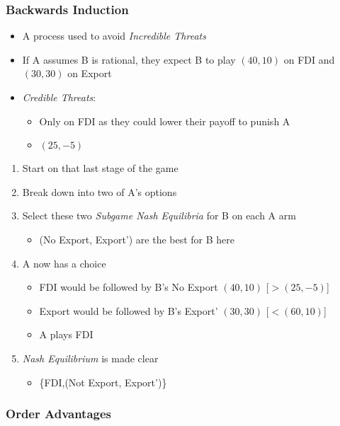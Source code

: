 \documentclass[11pt, english]{article}
\begin{document}
		\subsubsection{Backwards Induction}

	\begin{itemize}
	\setlength\itemsep{0cm}
		\item A process used to avoid \textit{Incredible Threats}
		\item If A assumes B is rational, they expect B to play $(40,10)$ on FDI and $(30,30)$ on Export
		\item \textit{Credible Threats}:
		\begin{itemize}
			\item Only on FDI as they could lower their payoff to punish A
			\item $(25,-5)$
		\end{itemize}
	\end{itemize}

	\begin{enumerate}
	\itemsep\setlength{0cm}
		\item Start on that last stage of the game
		\item Break down into two of A's options
		\item Select these two \textit{Subgame Nash Equilibria} for B on each A arm
		\begin{itemize}
			\item (No Export, Export') are the best for B here
		\end{itemize}
		\item A now has a choice
		\begin{itemize}
			\item FDI would be followed by B's  No Export $(40,10)$ [$>(25,-5)$]
			\item Export would be followed by B's Export' $(30,30)$ [$<(60,10)$]
			\item A plays FDI
		\end{itemize}
		\item \textit{Nash Equilibrium} is made clear
		\begin{itemize}
			\item \{FDI,(Not Export, Export')\}
		\end{itemize}
	\end{enumerate}

		\subsubsection{Order Advantages}
\end{document}
